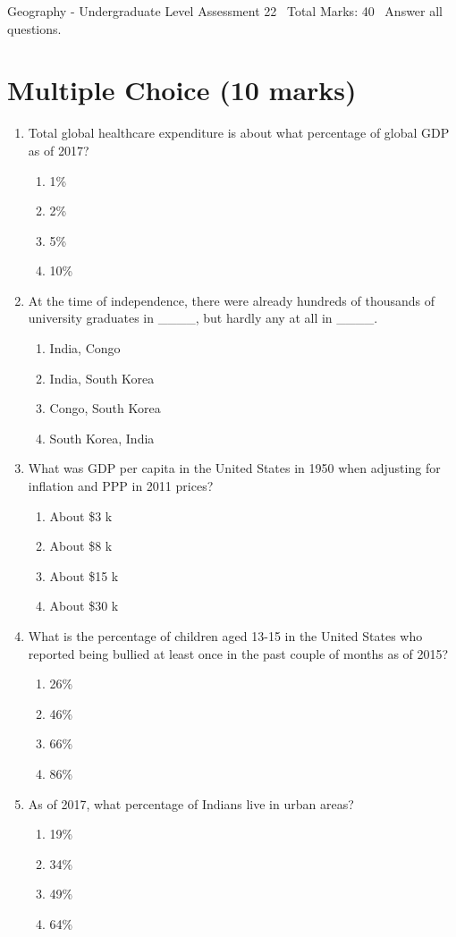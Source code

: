 \documentclass[12pt]{article}
\begin{document}
\begin{center}
Geography - Undergraduate Level Assessment 22 \
Total Marks: 40 \
Answer all questions.
\end{center}

\section*{Multiple Choice (10 marks)}
\begin{enumerate}[label=\arabic*.]
\item Total global healthcare expenditure is about what percentage of global GDP as of 2017?
\begin{enumerate}[label=(\alph*)]
    \item 1\%
    \item 2\%
    \item 5\%
    \item 10\%
\end{enumerate}
\item At the time of independence, there were already hundreds of thousands of university graduates in \_\_\_\_, but hardly any at all in \_\_\_\_.
\begin{enumerate}[label=(\alph*)]
    \item India, Congo
    \item India, South Korea
    \item Congo, South Korea
    \item South Korea, India
\end{enumerate}
\item What was GDP per capita in the United States in 1950 when adjusting for inflation and PPP in 2011 prices?
\begin{enumerate}[label=(\alph*)]
    \item About \$3 k
    \item About \$8 k
    \item About \$15 k
    \item About \$30 k
\end{enumerate}
\item What is the percentage of children aged 13-15 in the United States who reported being bullied at least once in the past couple of months as of 2015?
\begin{enumerate}[label=(\alph*)]
    \item 26\%
    \item 46\%
    \item 66\%
    \item 86\%
\end{enumerate}
\item As of 2017, what percentage of Indians live in urban areas?
\begin{enumerate}[label=(\alph*)]
    \item 19\%
    \item 34\%
    \item 49\%
    \item 64\%
\end{enumerate}
\end{enumerate}
\end{document}
